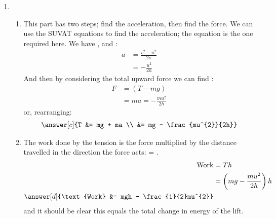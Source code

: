 \begin{problem}[HE+_Lift]
{\begin{enumerate}
\begin{enumerate}
or, rearranging 
\begin{eqnarray*} 
\answer[a]{T &= mg - ma \\ 
&= mg + \frac{mu^{2}}{2h}}
\end{eqnarray*}
	\item The work done by the tension is the force multiplied by the distance travelled in the direction the force acts:  =  (as the tension acts in the opposite direction to the distance).
	\begin{eqnarray*} 
	\text{Work} &= -Th \\
	&= -\left(mg + \frac{mu^{2}}{2h}\right)h \\ 
	\answer[b]{\text{Work}&= - mgh - \frac{1}{2}mu^{2}}
	\end{eqnarray*}
and it should be clear this equals the total change in energy of the lift.
\end{enumerate}
\item 
\begin{enumerate} 
\item This part has two steps; find the acceleration, then find the force. We can use the SUVAT equations to find the acceleration; the equation  is the one required here. We have ,  and :
\begin{eqnarray*} 
a &= \frac{v^{2} - u^{2}}{2s} \\ 
&= -\frac{u^{2}}{2h} 
\end{eqnarray*}
And then by considering the total upward force we can find :
\begin{eqnarray*} 
F &= (T - mg) \\ 
&= ma = -\frac{mu^{2}}{2h} 
\end{eqnarray*}
or, rearranging:
\begin{eqnarray*} 
\answer[c]{T &= mg + ma \\ 
&= mg - \frac{mu^{2}}{2h}} 
\end{eqnarray*}
	\item The work done by the tension is the force multiplied by the distance travelled in the direction the force acts:  = .
	\begin{eqnarray*} 
	\text{Work} &= Th \\
	&= \left(mg - \frac{mu^{2}}{2h}\right)h \\ 
	\answer[d]{\text{Work} &= mgh - \frac{1}{2}mu^{2}} 
	\end{eqnarray*}
and it should be clear this equals the total change in energy of the lift. 
\end{enumerate}
\end{enumerate}}
\end{problem}